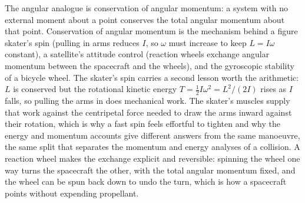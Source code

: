 The angular analogue is conservation of angular momentum: a system
with no external moment about a point conserves the total angular
momentum about that point. Conservation of angular momentum is the
mechanism behind a figure skater's spin (pulling in arms reduces
$I$, so $\omega$ must increase to keep $L = I\omega$ constant), a
satellite's attitude control (reaction wheels exchange angular
momentum between the spacecraft and the wheels), and the gyroscopic
stability of a bicycle wheel. The skater's spin carries a second
lesson worth the arithmetic: $L$ is conserved but the rotational
kinetic energy $T=\tfrac{1}{2}I\omega^{2}=L^{2}/(2I)$ rises as $I$
falls, so pulling the arms in does mechanical work. The skater's
muscles supply that work against the centripetal force needed to draw
the arms inward against their rotation, which is why a fast spin feels
effortful to tighten and why the energy and momentum accounts give
different answers from the same manoeuvre, the same split that
separates the momentum and energy analyses of a collision. A reaction
wheel makes the exchange explicit and reversible: spinning the wheel
one way turns the spacecraft the other, with the total angular momentum
fixed, and the wheel can be spun back down to undo the turn, which is
how a spacecraft points without expending propellant.

